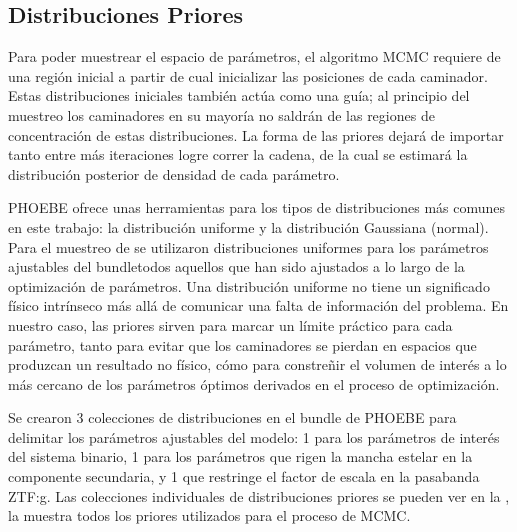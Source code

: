 \newpage
\clearpage

\subsection{Distribuciones Priores}

Para poder muestrear el espacio de parámetros, el algoritmo MCMC requiere de una
región inicial a partir de cual inicializar las posiciones de cada caminador.
Estas distribuciones iniciales también actúa como una guía; al principio del
muestreo los caminadores en su mayoría no saldrán de las regiones de
concentración de estas distribuciones. La forma de las priores dejará de
importar tanto entre más iteraciones logre correr la cadena, de la cual se
estimará la distribución posterior de densidad de cada parámetro.

PHOEBE ofrece unas herramientas para los tipos de distribuciones más comunes en
este trabajo: la distribución uniforme y la distribución Gaussiana (normal).
Para el muestreo de \atoObjId se utilizaron distribuciones uniformes para los
parámetros ajustables del bundle\textemdash todos aquellos que han sido
ajustados a lo largo de la optimización de parámetros. Una distribución uniforme
no tiene un significado físico intrínseco más allá de comunicar una falta de
información del problema. En nuestro caso, las priores sirven para marcar un
límite práctico para cada parámetro, tanto para evitar que los caminadores se
pierdan en espacios que produzcan un resultado no físico, cómo para constreñir
el volumen de interés a lo más cercano de los parámetros óptimos derivados en el
proceso de optimización. 

Se crearon 3 colecciones de distribuciones en el bundle de PHOEBE para delimitar
los parámetros ajustables del modelo: 1 para los parámetros de interés del
sistema binario, 1 para los parámetros que rigen la mancha estelar en la
componente secundaria, y 1 que restringe el factor de escala en la pasabanda
ZTF:g. Las colecciones individuales de distribuciones priores se pueden ver en
la , la
muestra todos los priores utilizados para el proceso de MCMC.

